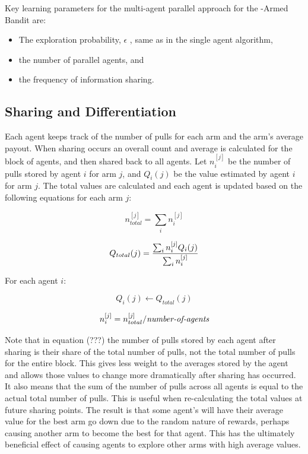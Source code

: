 \documentclass[11pt]{article} %
\begin{document}
\begin{flushleft}

Key learning parameters for the multi-agent parallel approach for the  -Armed Bandit are:

\begin{itemize}
\item
The exploration probability, $\epsilon$ , same as in the single agent algorithm,
\item
the number of parallel agents, and
\item
the frequency of information sharing.
\end{itemize}

\subsection{Sharing and Differentiation}
Each agent keeps track of the number of pulls for each arm and the arm’s average payout.  When sharing occurs an overall count and average is calculated for the block of agents, and then shared back to all agents.  Let $n_i^{[j]}$ be the number of pulls stored by agent $i$ for arm $j$, and $Q_i(j)$ be the value estimated by agent $i$ for arm $j$.  The total values are calculated and each agent is updated based on the following equations for each arm $j$:

\begin{equation}
n_{total}^{[j]}=\sum_in_i^{[j]}
\end{equation}

\begin{equation}
Q_{total}(j)={ {\sum_in_i^{[j]}Q_i(j)} \over {\sum_in_i^{[j]}}}
\end{equation}

For each agent $i$:

\begin{equation}
Q_i(j) \gets Q_{total}(j)
\end{equation}

\begin{equation}
n_i^{[j]} = n_{total}^{[j]}/\mbox{\it number-of-agents}
\end{equation}

Note that in equation (???) the number of pulls stored by each agent after sharing is their share of the total number of pulls, not the total number of pulls for the entire block.  This gives less weight to the averages stored by the agent and allows those values to change more dramatically after sharing has occurred.  It also means that the sum of the number of pulls across all agents is equal to the actual total number of pulls.  This is useful when re-calculating the total values at future sharing points.  The result is that some agent's will have their average value for the best arm go down due to the random nature of rewards, perhaps causing another arm to become the best for that agent.  This has the ultimately beneficial effect of causing agents to explore other arms with high average values.


\end{flushleft}
\end{document}

